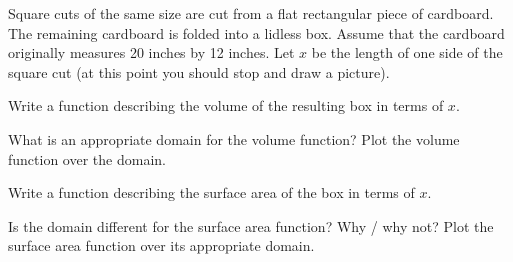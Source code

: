 \begin{exercises}
\item Square cuts of the same size are cut from a flat rectangular piece of cardboard. The
    remaining cardboard is folded into a lidless box. Assume that the cardboard originally
    measures 20 inches by 12 inches. Let $x$ be the length of one side of the square cut (at
    this point you should stop and draw a picture).
    \ba
        \item Write a function describing the volume of the resulting box in terms of $x$.
        \item What is an appropriate domain for the volume function?  Plot the volume function
            over the domain.
        \item Write a function describing the surface area of the box in terms of $x$.
        \item Is the domain different for the surface area function?  Why / why not?  Plot
            the surface area function over its appropriate domain.
    \ea

\end{exercises}
\afterexercises
